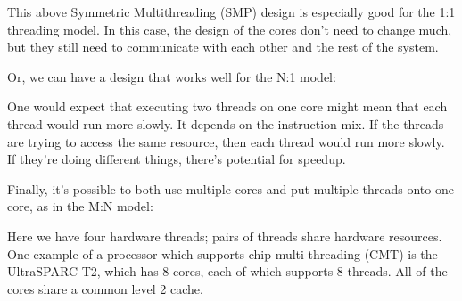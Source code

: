 \documentclass[a4paper]{report}
\begin{document}
This above Symmetric Multithreading (SMP) design is especially good for the 1:1 threading model. In
this case, the design of the cores don't need to change much, but they
still need to communicate with each other and the rest of the system.

Or, we can have a design that works well for the N:1 model:
\begin{center}
\end{center}

One would expect that executing two threads on one core might
mean that each thread would run more slowly. It depends on the instruction
mix. If the threads are trying to access the same resource, then each
thread would run more slowly. If they're doing different things, there's 
potential for speedup.

Finally, it's possible to both use multiple cores and put multiple threads
onto one core, as in the M:N model:

\begin{center}
\end{center}
Here we have four hardware threads; pairs of threads share hardware
resources. One example of a processor which supports chip multi-threading
(CMT) is the UltraSPARC T2, which has 8 cores, each of which supports 8 
threads. All of the cores share a common level 2 cache.
\end{document}
